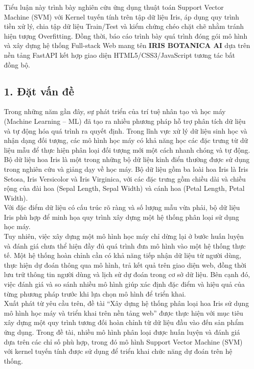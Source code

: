 \documentclass[14pt]{extarticle}
\begin{document}
		 \noindent  Tiểu luận này trình bày nghiên cứu ứng dụng thuật toán Support Vector Machine (SVM) với Kernel tuyến tính trên tập dữ liệu Iris, áp dụng quy trình tiền xử lý, chia tập dữ liệu Train/Test và kiểm chứng chéo chặt chẽ nhằm tránh hiện tượng Overfitting. Đồng thời, báo cáo trình bày quá trình đóng gói mô hình và xây dựng hệ thống Full-stack Web mang tên \textbf{IRIS BOTANICA AI} dựa trên nền tảng FastAPI kết hợp giao diện HTML5/CSS3/JavaScript tương tác bất đồng bộ.
		 
\subsection*{1. Đặt vấn đề}
	
		 \noindent Trong những năm gần đây, sự phát triển của trí tuệ nhân tạo và học máy (Machine Learning -- ML) đã tạo ra nhiều phương pháp hỗ trợ phân tích dữ liệu và tự động hóa quá trình ra quyết định. Trong lĩnh vực xử lý dữ liệu sinh học và nhận dạng đối tượng, các mô hình học máy có khả năng học các đặc trưng từ dữ liệu mẫu để thực hiện phân loại đối tượng mới một cách nhanh chóng và tự động.\\
	
		 \noindent Bộ dữ liệu hoa Iris là một trong những bộ dữ liệu kinh điển thường được sử dụng trong nghiên cứu và giảng dạy về học máy. Bộ dữ liệu gồm ba loài hoa Iris là Iris Setosa, Iris Versicolor và Iris Virginica, với các đặc trưng gồm chiều dài và chiều rộng của đài hoa (Sepal Length, Sepal Width) và cánh hoa (Petal Length, Petal Width).\\
		 
		 \noindent Với đặc điểm dữ liệu có cấu trúc rõ ràng và số lượng mẫu vừa phải, bộ dữ liệu Iris phù hợp để minh họa quy trình xây dựng một hệ thống phân loại sử dụng học máy.\\
		 
		 \noindent Tuy nhiên, việc xây dựng một mô hình học máy chỉ dừng lại ở bước huấn luyện và đánh giá chưa thể hiện đầy đủ quá trình đưa mô hình vào một hệ thống thực tế. Một hệ thống hoàn chỉnh cần có khả năng tiếp nhận dữ liệu từ người dùng, thực hiện dự đoán thông qua mô hình, trả kết quả trên giao diện web, đồng thời lưu trữ thông tin người dùng và lịch sử dự đoán trong cơ sở dữ liệu. Bên cạnh đó, việc đánh giá và so sánh nhiều mô hình giúp xác định đặc điểm và hiệu quả của từng phương pháp trước khi lựa chọn mô hình để triển khai.\\
		 
		 \noindent Xuất phát từ yêu cầu trên, đề tài ``Xây dựng hệ thống phân loại hoa Iris sử dụng mô hình học máy và triển khai trên nền tảng web'' được thực hiện với mục tiêu xây dựng một quy trình tương đối hoàn chỉnh từ dữ liệu đầu vào đến sản phẩm ứng dụng. Trong đề tài, nhiều mô hình phân loại được huấn luyện và đánh giá dựa trên các chỉ số phù hợp, trong đó mô hình Support Vector Machine (SVM) với kernel tuyến tính được sử dụng để triển khai chức năng dự đoán trên hệ thống.\\
		 
\end{document}
